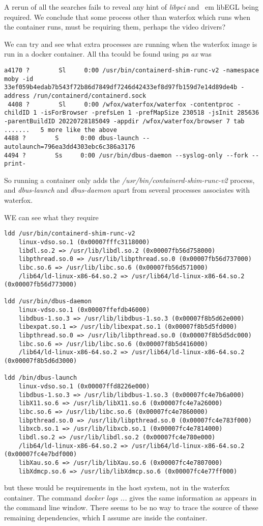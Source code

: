 \documentclass{article}  %
\begin{document}
A rerun of all the searches fails to reveal any hint of {\em libpci} and {\
em libEGL} being required. We conclude that some process other than waterfox which runs when the container runs, must be requiring them, perhaps the video drivers?

We can try and see what extra processes are running when the waterfox image is run in a docker container. All tha tcould be found using {\em pa ax} was
\begin{verbatim}
a4170 ?        Sl     0:00 /usr/bin/containerd-shim-runc-v2 -namespace moby -id 33ef059b4edab7b543f72b86d7849df7246d42433ef8d97fb159d7e14d89de4b -address /run/containerd/containerd.sock
 4408 ?        Sl     0:00 /wfox/waterfox/waterfox -contentproc -childID 1 -isForBrowser -prefsLen 1 -prefMapSize 230518 -jsInit 285636 -parentBuildID 20220728185049 -appdir /wfox/waterfox/browser 7 tab
.......   5 more like the above
4488 ?        S      0:00 dbus-launch --autolaunch=796ea3dd4303ebc6c386a3176
4494 ?        Ss     0:00 /usr/bin/dbus-daemon --syslog-only --fork --print-
\end{verbatim}
 So running a container only adds the {\em /usr/bin/containerd-shim-runc-v2} process, and {\em dbus-launch} and {\em dbus-daemon} apart from several processes associates with waterfox.

WE can see what they require
\begin{verbatim}
ldd /usr/bin/containerd-shim-runc-v2
	linux-vdso.so.1 (0x00007fffc3118000)
	libdl.so.2 => /usr/lib/libdl.so.2 (0x00007fb56d758000)
	libpthread.so.0 => /usr/lib/libpthread.so.0 (0x00007fb56d737000)
	libc.so.6 => /usr/lib/libc.so.6 (0x00007fb56d571000)
	/lib64/ld-linux-x86-64.so.2 => /usr/lib64/ld-linux-x86-64.so.2 (0x00007fb56d773000)

ldd /usr/bin/dbus-daemon
	linux-vdso.so.1 (0x00007ffefdb46000)
	libdbus-1.so.3 => /usr/lib/libdbus-1.so.3 (0x00007f8b5d62e000)
	libexpat.so.1 => /usr/lib/libexpat.so.1 (0x00007f8b5d5fd000)
	libpthread.so.0 => /usr/lib/libpthread.so.0 (0x00007f8b5d5dc000)
	libc.so.6 => /usr/lib/libc.so.6 (0x00007f8b5d416000)
	/lib64/ld-linux-x86-64.so.2 => /usr/lib64/ld-linux-x86-64.so.2 (0x00007f8b5d6d3000)

ldd /bin/dbus-launch
	linux-vdso.so.1 (0x00007ffd8226e000)
	libdbus-1.so.3 => /usr/lib/libdbus-1.so.3 (0x00007fc4e7b6a000)
	libX11.so.6 => /usr/lib/libX11.so.6 (0x00007fc4e7a26000)
	libc.so.6 => /usr/lib/libc.so.6 (0x00007fc4e7860000)
	libpthread.so.0 => /usr/lib/libpthread.so.0 (0x00007fc4e783f000)
	libxcb.so.1 => /usr/lib/libxcb.so.1 (0x00007fc4e7814000)
	libdl.so.2 => /usr/lib/libdl.so.2 (0x00007fc4e780e000)
	/lib64/ld-linux-x86-64.so.2 => /usr/lib64/ld-linux-x86-64.so.2 (0x00007fc4e7bdf000)
	libXau.so.6 => /usr/lib/libXau.so.6 (0x00007fc4e7807000)
	libXdmcp.so.6 => /usr/lib/libXdmcp.so.6 (0x00007fc4e77ff000)

\end{verbatim}
but these would be requirements in the host system, not in the waterfox container.
The command {\em docker logs ...} gives the same information as appears in the command line window.  There seems to be no way  to trace the source of these remaining dependencies, which I assume are inside the container.
\end{document}
